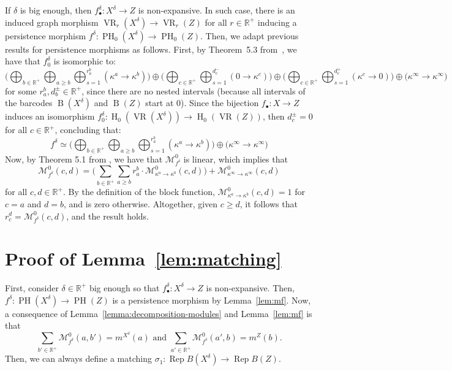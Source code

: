 \documentclass{article}
\DeclareMathOperator{\PH}{PH}
\DeclareMathOperator{\VR}{VR}
\DeclareMathOperator{\Ho}{H}
\DeclareMathOperator{\B}{B}
\DeclareMathOperator{\Rep}{Rep}
\newcommand{\R}{\mathbb{R}^+}
\newcommand{\cM}{\mathcal{M}}
\newcommand{\scst}{\scriptscriptstyle}
\newcommand{\mXdelta}{m^{\scst X^{\delta}}}
\newcommand{\mZ}{m^{\scst Z}}
\newcommand{\ka}{\kappa^a}
\newcommand{\kb}{\kappa^b}
\newcommand{\kc}{\kappa^c}
\newcommand{\kinfty}{\kappa^\infty}
\newcommand{\Xdelta}{X^{\delta}}
\begin{document}
If $\delta$ is big enough, then $f^{\delta}_{\bullet}\colon \Xdelta\to Z$ is non-expansive.
In such case, there is an induced graph morphism $\VR_r(X^\delta) \rightarrow \VR_r(Z)$ for all $r\in\R$ inducing a persistence morphism
$f^{\delta}
   \colon \PH_0(\Xdelta)\to \PH_0(Z)$.
Then, we 
 adapt previous results for
persistence morphisms as follows.
First, by 
Theorem~5.3 from~\cite{Jacquard2023}, we have that $f^{\delta}_0$ is isomorphic to:
\[
   \bigg(
        \bigoplus_{ b \in \R} \bigoplus_{a\geq b} 
        \bigoplus_{s=1}^{r^b_a} 
        (\ka \rightarrow \kb)\bigg)     
       \oplus
\bigg(\bigoplus_{c\in\R} 
\bigoplus_{s=1}^{d^-_c}
(0 \rightarrow \kc)\bigg)
\oplus
\bigg(\bigoplus_{c\in\R} \bigoplus_{s=1}^{d^+_c}
(\kc \rightarrow 0)\bigg) 
       \oplus\big(\kinfty\rightarrow \kinfty\big)
        \]
       for some  $r^b_a,d^\pm_b\in\R$, since 
 there are no nested intervals (because 
all intervals of the barcodes $\B(\Xdelta)$ and 
$\B(Z)$ start at $0$). 
Since the bijection $f_\bullet\colon X\to Z$  induces an isomorphism
$f^{\delta}_0:\Ho_0(\VR(\Xdelta))\to \Ho_0(\VR(Z))$,
then $d^\pm_c=0$ for all $c\in\R$, concluding that:
\[f^{\delta}\simeq
   \bigg(
        \bigoplus_{ b \in \R} \bigoplus_{a\geq b} 
        \bigoplus_{s=1}^{r^b_a} 
        (\ka \rightarrow \kb)\bigg)     
              \oplus\big(\kinfty\rightarrow \kinfty\big)
        \]
Now, by Theorem 5.1  from \cite{matchings},
we have that $\cM_{f^{\delta}}^0$ is linear, which implies that
\[
\cM^0_{f^\delta}(c,d) =
\Bigg(\sum_{b \in \R} \sum_{a\geq b} 
r^b_a \cdot 
\cM^0_{\ka\to \kb}(c,d)\Bigg) + \cM^0_{\kappa^\infty\to \kappa^\infty}(c,d)
\]
for all $c,d \in \R$.
By the definition of the block function, $\cM^0_{\ka\to \kb}(c,d)=1$ for $c=a$ and $d=b$, and is zero otherwise. 
Altogether, given $c\geq d$, 
it follows that 
$r^d_c=\cM^0_{f^\delta}(c,d)$, 
and the result holds.

\section{Proof of Lemma~\ref{lem:matching}}\label{prooflem:matching}

First, 
 consider $\delta\in\R$ big enough so that $f^\delta_\bullet:\Xdelta\to Z$ is non-expansive. Then,    $f^{\delta}:
\PH(X^\delta)\to \PH(Z)
  $ is a persistence morphism by Lemma~\ref{lem:mf}. 
  Now,  a consequence of 
  Lemma~\ref{lemma:decomposition-modules} and Lemma~\ref{lem:mf} is that 
  \[\mbox{$\sum_{b' \in \R} \cM_{f^{\delta}}^0(a,b') = \mXdelta(a)$ and $\sum_{a' \in \R} \cM_{f^{\delta}}^0(a',b) = \mZ(b)$.}\]
 Then,  we can always define a matching 
$ \sigma_1\colon\Rep B(\Xdelta)\to \Rep B(Z)$.
\end{document}
